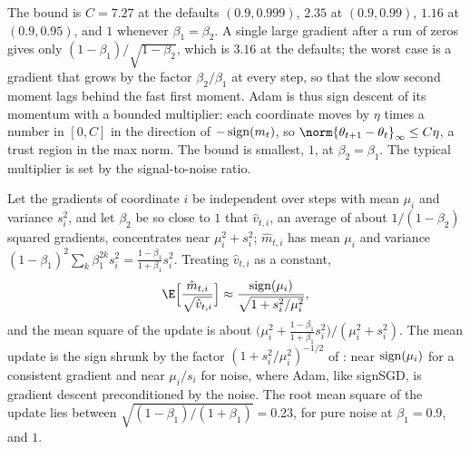 \begin{refsection}
The bound is $C=7.27$ at the defaults $(0.9,0.999)$, $2.35$ at $(0.9,0.99)$, $1.16$ at $(0.9,0.95)$, and $1$ whenever $\beta_1=\beta_2$. A single large gradient after a run of zeros gives only $(1-\beta_1)/\sqrt{1-\beta_2}$, which is $3.16$ at the defaults; the worst case is a gradient that grows by the factor $\beta_2/\beta_1$ at every step, so that the slow second moment lags behind the fast first moment. Adam is thus sign descent of its momentum with a bounded multiplier: each coordinate moves by $\eta$ times a number in $[0,C]$ in the direction of $-\operatorname{sign}(m_t)$, so $\norm{\theta_{t+1}-\theta_t}_\infty\le C\eta$, a trust region in the max norm. The bound is smallest, $1$, at $\beta_2=\beta_1$. The typical multiplier is set by the signal-to-noise ratio.

\begin{heuristic}
Let the gradients of coordinate $i$ be independent over steps with mean $\mu_i$ and variance $s_i^2$, and let $\beta_2$ be so close to $1$ that $\hat v_{t,i}$, an average of about $1/(1-\beta_2)$ squared gradients, concentrates near $\mu_i^2+s_i^2$; $\hat m_{t,i}$ has mean $\mu_i$ and variance $(1-\beta_1)^2\sum_k\beta_1^{2k}s_i^2=\frac{1-\beta_1}{1+\beta_1}s_i^2$. Treating $\hat v_{t,i}$ as a constant,
\begin{equation}\label{eq:sign:snr}
  \E\Bigl[\frac{\hat m_{t,i}}{\sqrt{\hat v_{t,i}}}\Bigr]\approx\frac{\sign(\mu_i)}{\sqrt{1+s_i^2/\mu_i^2}},
\end{equation}
and the mean square of the update is about $\bigl(\mu_i^2+\frac{1-\beta_1}{1+\beta_1}s_i^2\bigr)/(\mu_i^2+s_i^2)$. The mean update is the sign shrunk by the factor $(1+s_i^2/\mu_i^2)^{-1/2}$ of \textcite{BallesHennig2018}: near $\operatorname{sign}(\mu_i)$ for a consistent gradient and near $\mu_i/s_i$ for noise, where Adam, like signSGD, is gradient descent preconditioned by the noise. The root mean square of the update lies between $\sqrt{(1-\beta_1)/(1+\beta_1)}=0.23$, for pure noise at $\beta_1=0.9$, and $1$.
\end{heuristic}


\end{refsection}
